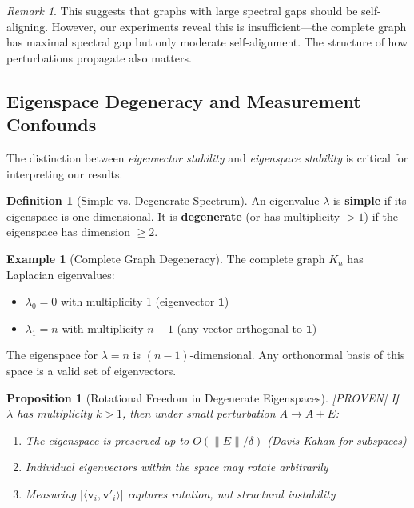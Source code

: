 \documentclass[11pt,a4paper]{article}
\newtheorem{proposition}[theorem]{Proposition}
\theoremstyle{definition}
\newtheorem{definition}[theorem]{Definition}
\newtheorem{example}[theorem]{Example}
\theoremstyle{remark}
\newtheorem{remark}[theorem]{Remark}
\newcommand{\inner}[2]{\langle #1, #2 \rangle}
\newcommand{\norm}[1]{\| #1 \|}
\newcommand{\proven}{\textcolor{green!50!black}{[PROVEN]}}
\begin{document}
\begin{remark}
This suggests that graphs with large spectral gaps should be self-aligning. However, our experiments reveal this is insufficient---the complete graph has maximal spectral gap but only moderate self-alignment. The structure of how perturbations propagate also matters.
\end{remark}

\subsection{Eigenspace Degeneracy and Measurement Confounds}
\label{sec:degeneracy}

The distinction between \emph{eigenvector stability} and \emph{eigenspace stability} is critical for interpreting our results.

\begin{definition}[Simple vs. Degenerate Spectrum]
An eigenvalue $\lambda$ is \textbf{simple} if its eigenspace is one-dimensional. It is \textbf{degenerate} (or has multiplicity $> 1$) if the eigenspace has dimension $\geq 2$.
\end{definition}

\begin{example}[Complete Graph Degeneracy]
\label{ex:complete-degeneracy}
The complete graph $K_n$ has Laplacian eigenvalues:
\begin{itemize}
    \item $\lambda_0 = 0$ with multiplicity 1 (eigenvector $\mathbf{1}$)
    \item $\lambda_1 = n$ with multiplicity $n-1$ (any vector orthogonal to $\mathbf{1}$)
\end{itemize}
The eigenspace for $\lambda = n$ is $(n-1)$-dimensional. Any orthonormal basis of this space is a valid set of eigenvectors.
\end{example}

\begin{proposition}[Rotational Freedom in Degenerate Eigenspaces] \proven
If $\lambda$ has multiplicity $k > 1$, then under small perturbation $A \to A + E$:
\begin{enumerate}[label=(\roman*)]
    \item The eigenspace is preserved up to $O(\norm{E}/\delta)$ (Davis-Kahan for subspaces)
    \item Individual eigenvectors within the space may rotate arbitrarily
    \item Measuring $|\inner{\mathbf{v}_i}{\mathbf{v}'_i}|$ captures rotation, not structural instability
\end{enumerate}
\end{proposition}
\end{document}
